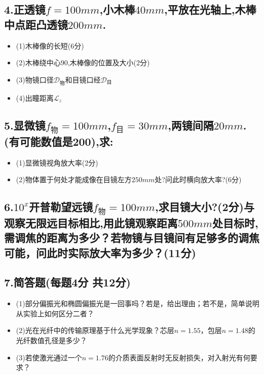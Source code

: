 \documentclass[11pt,a4paper]{article}
\begin{document}
    \subsection*{4.正透镜$f=100mm$,小木棒$40mm$,平放在光轴上,木棒中点距凸透镜$200mm$.}
    \begin{itemize}
        \vspace{0mm}
        \item (1)木棒像的长短(6分)
        \vspace{0mm}
        \item (2)木棒绕中心90,木棒像的位置及大小(2分)
        \vspace{0mm}
        \item (3)物镜口径\(\mathcal{D}_{\text{物}}\)和目镜口经\(\mathcal{D}_{\text{目}}\) 
        \vspace{0mm}
        \item (4)出瞳距离\(\mathcal{L}_{z}\)
    \end{itemize}
    \vspace{20mm}
    \subsection*{5.显微镜$f_\text{物}=100mm$,$f_\text{目}=30mm$,两镜间隔$20mm$.(有可能数值是200),求:}
    \begin{itemize}
        \vspace{0mm}
        \item (1)显微镜视角放大率(2分)
        \vspace{0mm}
        \item (2)物体置于何处才能成像在目镜左方$250mm处$?问此时横向放大率?(6分)
        \vspace{0mm}
    \end{itemize}
    \vspace{20mm}
    \subsection*{6.$10^{x}$开普勒望远镜$f_\text{物}=100mm$,求目镜大小?(2分)与观察无限远目标相比,用此镜观察距离$500mm$处目标时,需调焦的距离为多少？若物镜与目镜间有足够多的调焦可能，问此时实际放大率为多少？(11分)}
    \vspace{10mm}
    \subsection*{7.简答题(每题4分 共12分)}
    \begin{itemize}
        \vspace{-3mm}
        \item (1)部分偏振光和椭圆偏振光是一回事吗？若是，给出理由；若不是，简单说明从实验上如何区分二者？
        \vspace{-3mm}
        \item (2)光在光纤中的传输原理基于什么光学现象？芯层$n=1.55$，包层$n=1.48$的光纤数值孔径是多少？
        \vspace{-3mm}
        \item (3)若使激光通过一个$n=1.76$的介质表面反射时无反射损失，对入射光有何要求？
    \end{itemize}
\end{document}
